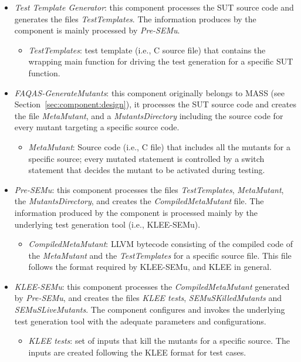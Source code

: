 \begin{itemize}
  \item \emph{Test Template Generator}: this component processes the SUT source code and generates the files \emph{TestTemplates}. The information produces by the component is mainly processed by \emph{Pre-SEMu}.
  \begin{itemize}
    \item \emph{TestTemplates}: test template (i.e., C source file) that contains the wrapping main function for driving the test generation for a specific SUT function.
  \end{itemize}
  \item \emph{FAQAS-GenerateMutants}: this component originally belongs to MASS (see Section~\ref{sec:component:design}), it processes the SUT source code and creates the file \emph{MetaMutant}, and a \emph{MutantsDirectory} including the source code for every mutant targeting a specific source code.
  \begin{itemize}
    \item \emph{MetaMutant}: Source code (i.e., C file) that includes all the mutants for a specific source; every mutated statement is controlled by a switch statement that decides the mutant to be activated during testing.
  \end{itemize}
  \item \emph{Pre-SEMu}: this component processes the files \emph{TestTemplates}, \emph{MetaMutant}, the \emph{MutantsDirectory}, and creates the \emph{CompiledMetaMutant} file. The information produced by the component is processed mainly by the underlying test generation tool (i.e., KLEE-SEMu).
  \begin{itemize}
    \item \emph{CompiledMetaMutant}: LLVM bytecode consisting of the compiled code of the \emph{MetaMutant} and the \emph{TestTemplates} for a specific source file. This file follows the format required by KLEE-SEMu, and KLEE in general.
  \end{itemize}
  \item \emph{KLEE-SEMu}: this component processes the \emph{CompiledMetaMutant} generated by \emph{Pre-SEMu}, and creates the files \emph{KLEE tests}, \emph{SEMuSKilledMutants} and \emph{SEMuSLiveMutants}. The component configures and invokes the underlying test generation tool with the adequate parameters and configurations.
  \begin{itemize}
    \item \emph{KLEE tests}: set of inputs that kill the mutants for a specific source. The inputs are created following the KLEE format for test cases.

\end{itemize}
\end{itemize}
